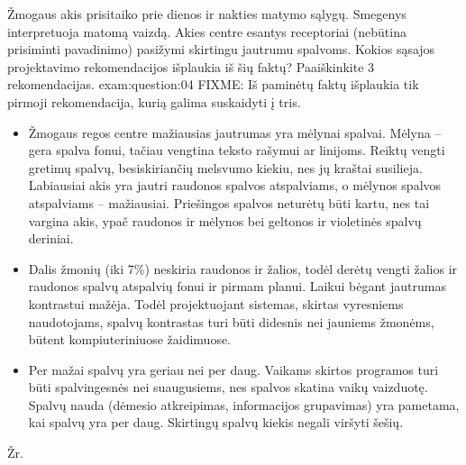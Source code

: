 \begin{question}{%
  Žmogaus akis prisitaiko prie dienos ir nakties matymo sąlygų. Smegenys
  interpretuoja matomą vaizdą. Akies centre esantys receptoriai
  (nebūtina prisiminti pavadinimo) pasižymi skirtingu jautrumu spalvoms.
  Kokios sąsajos projektavimo rekomendacijos išplaukia iš šių faktų?
  Paaiškinkite 3 rekomendacijas.
  }{exam:question:04}
  FIXME: Iš paminėtų faktų išplaukia tik pirmoji rekomendacija, kurią
  galima suskaidyti į tris.
  \begin{itemize}
    \item
      Žmogaus regos centre mažiausias jautrumas yra mėlynai spalvai.
      Mėlyna – gera spalva fonui, tačiau vengtina teksto rašymui ar
      linijoms. Reiktų vengti gretimų spalvų, besiskiriančių
      melsvumo kiekiu, nes jų kraštai susilieja. Labiausiai akis yra
      jautri raudonos spalvos atspalviams, o mėlynos spalvos
      atspalviams – mažiausiai. Priešingos spalvos neturėtų būti
      kartu, nes tai vargina akis, ypač raudonos ir mėlynos bei
      geltonos ir violetinės spalvų deriniai.
    \item
      Dalis žmonių (iki 7\%) neskiria raudonos ir žalios, todėl derėtų
      vengti žalios ir raudonos spalvų atspalvių fonui ir pirmam planui.
      Laikui bėgant jautrumas kontrastui mažėja. Todėl projektuojant
      sistemas, skirtas vyresniems naudotojams, spalvų kontrastas turi
      būti didesnis nei jauniems žmonėms, būtent kompiuteriniuose
      žaidimuose.
    \item
      Per mažai spalvų yra geriau nei per daug. Vaikams skirtos
      programos turi būti spalvingesnės nei suaugusiems, nes spalvos
      skatina vaikų vaizduotę. Spalvų nauda (dėmesio atkreipimas,
      informacijos grupavimas) yra pametama, kai spalvų yra per daug.
      Skirtingų spalvų kiekis negali viršyti šešių.
  \end{itemize}
  Žr. \cite[28--29]{konspektas}
\end{question}

